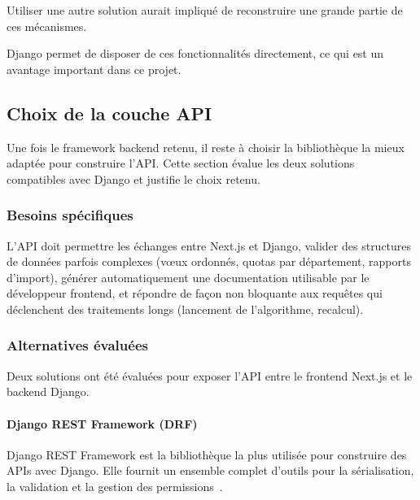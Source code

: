 Utiliser une autre solution aurait impliqué de reconstruire une grande partie de ces mécanismes.

Django permet de disposer de ces fonctionnalités directement, ce qui est un avantage important dans ce projet.


\subsection{Choix de la couche API}

Une fois le framework backend retenu, il reste à choisir la bibliothèque
la mieux adaptée pour construire l'API. Cette section évalue les deux
solutions compatibles avec Django et justifie le choix retenu.

\subsubsection{Besoins spécifiques}

L'API doit permettre les échanges entre Next.js
et Django, valider des structures de données
parfois complexes (vœux ordonnés, quotas par
département, rapports d'import), générer
automatiquement une documentation utilisable
par le développeur frontend, et répondre
de façon non bloquante aux requêtes qui
déclenchent des traitements longs
(lancement de l'algorithme, recalcul).

\subsubsection{Alternatives évaluées}

Deux solutions ont été évaluées pour exposer l'API entre le frontend Next.js et le backend Django.

\paragraph{Django REST Framework (DRF)}
Django REST Framework est la bibliothèque la plus utilisée pour construire
des APIs avec Django. Elle fournit un ensemble complet d'outils pour
la sérialisation, la validation et la gestion des permissions~\cite{drf_dev}.

